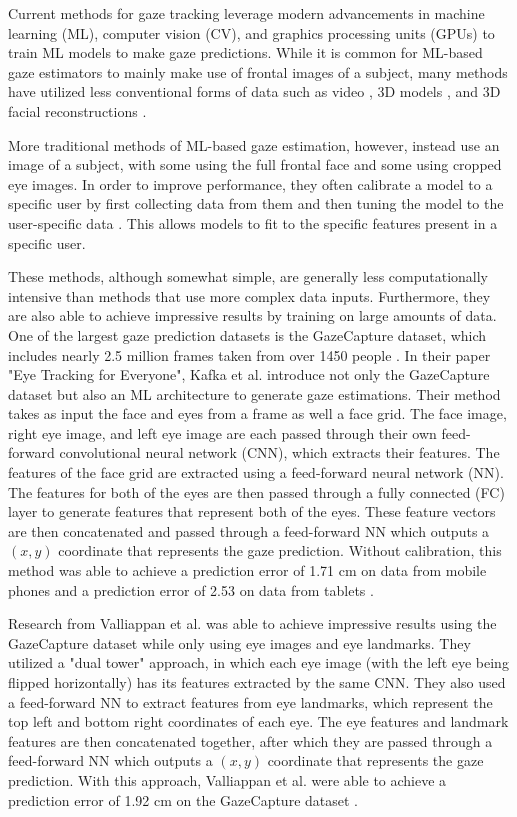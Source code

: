 \documentclass{article}
\begin{document}
Current methods for gaze tracking leverage modern advancements in machine learning (ML), computer vision (CV), and graphics processing units (GPUs) to train ML models to make gaze predictions. While it is common for ML-based gaze estimators to mainly make use of frontal images of a subject, many methods have utilized less conventional forms of data such as video \cite{videogaze}, 3D models \cite{3dmodelgaze}, and 3D facial reconstructions \cite{3dfacereconstruction}.

More traditional methods of ML-based gaze estimation, however, instead use an image of a subject, with some using the full frontal face and some using cropped eye images. In order to improve performance, they often calibrate a model to a specific user by first collecting data from them and then tuning the model to the user-specific data \cite{mitpaper, googlepaper}. This allows models to fit to the specific features present in a specific user.

These methods, although somewhat simple, are generally less computationally intensive than methods that use more complex data inputs. Furthermore, they are also able to achieve impressive results by training on large amounts of data. One of the largest gaze prediction datasets is the GazeCapture dataset, which includes nearly 2.5 million frames taken from over 1450 people \cite{mitpaper}. In their paper "Eye Tracking for Everyone", Kafka et al. introduce not only the GazeCapture dataset but also an ML architecture to generate gaze estimations. Their method takes as input the face and eyes from a frame as well a face grid. The face image, right eye image, and left eye image are each passed through their own feed-forward convolutional neural network (CNN), which extracts their features. The features of the face grid are extracted using a feed-forward neural network (NN). The features for both of the eyes are then passed through a fully connected (FC) layer to generate features that represent both of the eyes. These feature vectors are then concatenated and passed through a feed-forward NN which outputs a \((x, y)\) coordinate that represents the gaze prediction. Without calibration, this method was able to achieve a prediction error of 1.71 cm on data from mobile phones and a prediction error of 2.53 on data from tablets \cite{mitpaper}.

Research from Valliappan et al. was able to achieve impressive results using the GazeCapture dataset while only using eye images and eye landmarks. They utilized a "dual tower" approach, in which each eye image (with the left eye being flipped horizontally) has its features extracted by the same CNN. They also used a feed-forward NN to extract features from eye landmarks, which represent the top left and bottom right coordinates of each eye. The eye features and landmark features are then concatenated together, after which they are passed through a feed-forward NN which outputs a \((x, y)\) coordinate that represents the gaze prediction. With this approach, Valliappan et al. were able to achieve a prediction error of 1.92 cm on the GazeCapture dataset \cite{googlepaper}.
\end{document}
